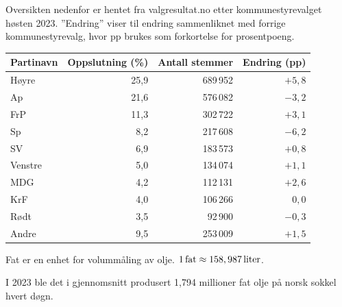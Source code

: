 \newpage
{}
Oversikten nedenfor er hentet fra valgresultat.no etter kommunestyrevalget høsten
2023. ''Endring'' viser til endring sammenliknet med forrige kommunestyrevalg, hvor pp brukes som forkortelse for prosentpoeng.
\begin{center}
	\small
	\begin{tabular}{l r r r}
		\hline
		\textbf{Partinavn} & \textbf{Oppslutning (\%)} & \textbf{Antall stemmer} & \textbf{Endring (pp)} \\
		\hline
		Høyre                        & 25,9 & 689\,952 & $+5,8$ \\
		\hline
		Ap             & 21,6 & 576\,082 & $-3,2$ \\
		\hline
		FrP           & 11,3 & 302\,722 & $+3,1$ \\
		\hline
		Sp                & 8,2  & 217\,608 & $-6,2$ \\
		\hline
		SV & 6,9 & 183\,573 & $+0,8$ \\
		\hline
		Venstre                      & 5,0  & 134\,074 & $+1,1$ \\
		\hline
		MDG      & 4,2  & 112\,131 & $+2,6$ \\
		\hline
		KrF         & 4,0  & 106\,266 & $0,0$ \\
		\hline
		Rødt                         & 3,5  & 92\,900  & $-0,3$ \\
		\hline
		Andre                        & 9,5  & 253\,009 & $+1,5$ \\
		\hline
	\end{tabular}
\end{center}
Fat er en enhet for volummåling av olje. $1\,\text{fat}\approx 158,987\,\text{liter}$. \os

I 2023 ble det i gjennomsnitt produsert 1,794 millioner fat
olje på norsk sokkel hvert døgn.

